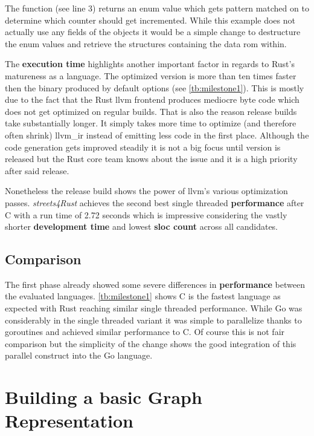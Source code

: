 The function  (see line 3) returns an enum value which gets pattern matched on to determine which counter should get incremented. While this example does not actually use any fields of the objects it would be a simple change to destructure the enum values and retrieve the structures containing the data rom within.

The \textbf{execution time} highlights another important factor in regards to Rust's matureness as a language. The optimized version is more than ten times faster then the binary produced by default options (see \autoref{tb:milestone1}). This is mostly due to the fact that the Rust \gls{llvm} frontend produces mediocre byte code which does not get optimized on regular builds. That is also the reason release builds take substantially longer. It simply takes more time to optimize (and therefore often shrink) \gls{llvm_ir} instead of emitting less code in the first place. Although the code generation gets improved steadily it is not a big focus until version  is released but the Rust core team knows about the issue and it is a high priority after said release.

Nonetheless the release build shows the power of \gls{llvm}'s various optimization passes. \textit{streets4Rust} achieves the second best single threaded \textbf{performance} after C with a run time of 2.72 seconds which is impressive considering the vastly shorter \textbf{development time} and lowest \textbf{\gls{sloc} count} across all candidates.

\subsection{Comparison}
\label{subsec:Implementation::Counting::Comparison}

The first phase already showed some severe differences in \textbf{performance} between the evaluated languages. \autoref{tb:milestone1} shows C is the fastest language as expected with Rust reaching similar single threaded performance. While Go was considerably in the single threaded variant it was simple to parallelize thanks to \glspl{goroutine} and achieved similar performance to C. Of course this is not fair comparison but the simplicity of the change shows the good integration of this parallel construct into the Go language.

\section{Building a basic Graph Representation}
\label{sec:Implementation::Graph_Representation}

